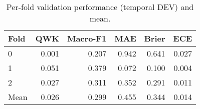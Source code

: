 \begin{table}
\caption{Per-fold validation performance (temporal DEV) and mean.}
\label{tab:cv-performance}
\begin{tabular}{lrrrrr}
\toprule
Fold & QWK & Macro-F1 & MAE & Brier & ECE \\
\midrule
0 & 0.001 & 0.207 & 0.942 & 0.641 & 0.027 \\
1 & 0.051 & 0.379 & 0.072 & 0.100 & 0.004 \\
2 & 0.027 & 0.311 & 0.352 & 0.291 & 0.011 \\
Mean & 0.026 & 0.299 & 0.455 & 0.344 & 0.014 \\
\bottomrule
\end{tabular}
\end{table}
